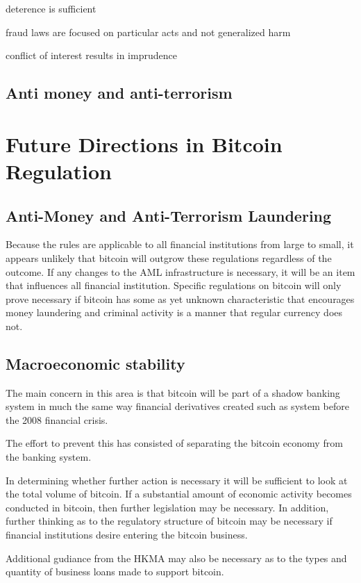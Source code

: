 deterence is sufficient

fraud laws are focused on particular acts and not generalized harm

conflict of interest results in imprudence





\subsection{Anti money and anti-terrorism}

\section{Future Directions in Bitcoin Regulation}

\subsection{Anti-Money and Anti-Terrorism Laundering}

Because the rules are applicable to all financial institutions from
large to small, it appears unlikely that bitcoin will outgrow these
regulations regardless of the outcome.  If any changes to the AML
infrastructure is necessary, it will be an item that influences all
financial institution.  Specific regulations on bitcoin will only
prove necessary if bitcoin has some as yet unknown characteristic that
encourages money laundering and criminal activity is a manner that
regular currency does not.

\subsection{Macroeconomic stability}

The main concern in this area is that bitcoin will be part of a
shadow banking system in much the same way financial derivatives
created such as system before the 2008 financial crisis.

The effort to prevent this has consisted of separating the bitcoin
economy from the banking system.  

In determining whether further action is necessary it will be
sufficient to look at the total volume of bitcoin.  If a substantial
amount of economic activity becomes conducted in bitcoin, then further
legislation may be necessary.  In addition, further thinking as to the
regulatory structure of bitcoin may be necessary if financial
institutions desire entering the bitcoin business.

Additional gudiance from the HKMA may also be necessary as to the
types and quantity of business loans made to support bitcoin.



